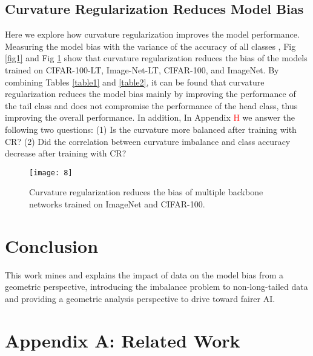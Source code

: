 \documentclass[10pt,twocolumn,letterpaper]{article}
\begin{document}
\subsection{Curvature Regularization Reduces Model Bias}

Here we explore how curvature regularization improves the model performance. Measuring the model bias with the variance of the accuracy of all classes \cite{paper27}, Fig \ref{fig1} and Fig \ref{fig8} show that curvature regularization reduces the bias of the models trained on CIFAR-100-LT, Image-Net-LT, CIFAR-100, and ImageNet. By combining Tables \ref{table1} and \ref{table2}, it can be found that curvature regularization reduces the model bias mainly by improving the performance of the tail class and does not compromise the performance of the head class, thus improving the overall performance. In addition, In Appendix \textcolor{red}{H} we answer the following two questions: (1) Is the curvature more balanced after training with CR? (2) Did the correlation between curvature imbalance and class accuracy decrease after training with CR?

\begin{figure}[h]
\vskip -0.1in
\centering
\centerline{\texttt{[image: 8]}}
\vskip -0.05in
\caption{Curvature regularization reduces the bias of multiple backbone networks trained on ImageNet and CIFAR-100.}
\label{fig8}
\vskip -0.2in
\end{figure}

\section{Conclusion}
This work mines and explains the impact of data on the model bias from a geometric perspective, introducing the imbalance problem to non-long-tailed data and providing a geometric analysis perspective to drive toward fairer AI.








\clearpage

\section*{Appendix A: Related Work}
\label{secA}
\end{document}
